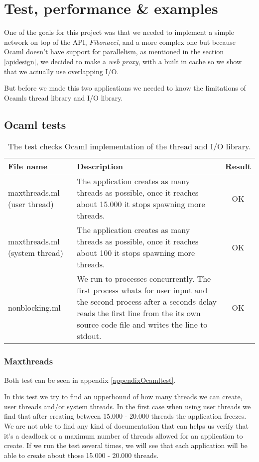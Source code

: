 \documentclass[a4paper,12pt]{article}
\begin{document}
\section{Test, performance \& examples}
\label{testexamples}
One of the goals for this project was that we needed to implement a simple
network on top of the API, \emph{Fibonacci}, and a more complex one but because Ocaml
doesn't have support for parallelism, as mentioned in the section \ref{apidesign},
we decided to make a \emph{web proxy}, with a built in cache so we show that we actually
use overlapping I/O.

But before we made this two applications we needed to know the limitations of
Ocamls thread library and I/O library.
\subsection{Ocaml tests}
\label{ocamltests}
\begin{table}[!h]
  \begin{center}
    \begin{tabular}{|p{3cm}|p{8.5cm}|c|}
      \hline
      File name &
      Description &
      Result \\
      \hline
      maxthreads.ml (user thread) &
      The application creates as many threads as possible, once it reaches
      about 15.000 it stops spawning more threads.&
      OK \\
      \hline
      maxthreads.ml (system thread) &
      The application creates as many threads as possible, once it reaches
      about 100 it stops spawning more threads.&
      OK \\
      \hline
      nonblocking.ml &
      We run to processes concurrently. The first process whats for user input
      and the second process after a seconds delay reads the first line from
      the its own source code file and writes the line to stdout.&
      OK \\
      \hline
    \end{tabular} 
    \caption{The test checks Ocaml implementation of the thread and I/O library.}
    \label{testtable}
  \end{center}
\end{table}
\subsubsection{Maxthreads}
Both test can be seen in appendix \ref{appendixOcamltest}.

In this test we try to find an upperbound of how many threads we can create,
user threads and/or system threads. In the first case when using user threads we
find that after creating between 15.000 - 20.000 threads the application
freezes. We are not able to find any kind of documentation that can helps us
verify that it's a deadlock or a maximum number of threads allowed for an
application to create. If we run the test several times, we will see that
each application will be able to create about those 15.000 - 20.000 threads.
\end{document}
